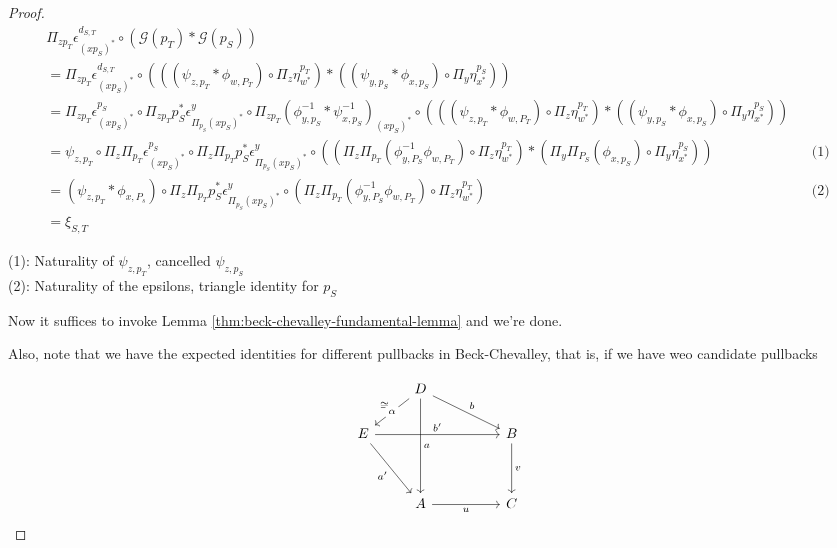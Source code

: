 \documentclass[10pt, oneside]{article}
\begin{document}
\begin{proof}
\begin{align*}
    \Pi_{z p_T} \epsilon^{d_{S, T}}_{(x p_S)^\ast} \circ (\mathcal{G}(p_T) \ast \mathcal{G}(p_S))
    \\ = \Pi_{z p_T} \epsilon^{d_{S, T}}_{(x p_S)^\ast} \circ (((\psi_{z, p_T} \ast \phi_{w, P_T}) \circ \Pi_z \eta^{p_T}_{w^\ast}) \ast ((\psi_{y, p_S} \ast \phi_{x, p_S}) \circ \Pi_y \eta^{p_S}_{x^\ast}))
    \\ = \Pi_{z p_T} \epsilon^{p_S}_{(x p_S)^\ast} \circ \Pi_{z p_T} p_S^\ast \epsilon^{y}_{\Pi_{p_S} (x p_S)^\ast} \circ \Pi_{z p_T} (\phi_{y, p_S}^{-1} \ast \psi_{x, p_S}^{-1})_{(x p_S)^\ast} \circ (((\psi_{z, p_T} \ast \phi_{w, P_T}) \circ \Pi_z \eta^{p_T}_{w^\ast}) \ast ((\psi_{y, p_S} \ast \phi_{x, p_S}) \circ \Pi_y \eta^{p_S}_{x^\ast}))
    \\ = \psi_{z, p_T} \circ \Pi_{z} \Pi_{p_T} \epsilon^{p_S}_{(x p_S)^\ast} \circ \Pi_{z} \Pi_{p_T} p_S^\ast \epsilon^{y}_{\Pi_{p_S} (x p_S)^\ast} \circ ((\Pi_{z} \Pi_{p_T} (\phi^{-1}_{y, P_S} \phi_{w, P_T}) \circ \Pi_z \eta^{p_T}_{w^\ast}) \ast (\Pi_{y} \Pi_{P_S} (\phi_{x, p_S}) \circ \Pi_y \eta^{p_S}_{x^\ast})) && \text{(1)}
    \\ = (\psi_{z, p_T} \ast \phi_{x, P_s}) \circ \Pi_{z} \Pi_{p_T} p_S^\ast \epsilon^{y}_{\Pi_{p_S} (x p_S)^\ast} \circ (\Pi_{z} \Pi_{p_T} (\phi^{-1}_{y, P_S} \phi_{w, P_T}) \circ \Pi_z \eta^{p_T}_{w^\ast}) && \text{(2)}
    \\ = \xi_{S, T}
\end{align*}

\noindent
(1): Naturality of $\psi_{z, p_T}$, cancelled $\psi_{z, p_S}$ \\
(2): Naturality of the epsilons, triangle identity for $p_S$

Now it suffices to invoke Lemma \ref{thm:beck-chevalley-fundamental-lemma} and we're done.

Also, note that we have the expected identities for different pullbacks in Beck-Chevalley, that is, if we have weo candidate pullbacks

\[\begin{tikzcd}[ampersand replacement=\&]
	\& D \\
	E \&\&\& B \\
	\\
	\& A \&\& C
	\arrow["a", from=1-2, to=4-2]
	\arrow["b", from=1-2, to=2-4]
	\arrow["{a^\prime}"', from=2-1, to=4-2]
	\arrow["{b^\prime}", from=2-1, to=2-4]
	\arrow["u"', from=4-2, to=4-4]
	\arrow["v", from=2-4, to=4-4]
	\arrow["\cong"', draw=none, from=1-2, to=2-1]
	\arrow["\alpha"{description}, from=1-2, to=2-1]
\end{tikzcd}\]


\end{proof}
\end{document}
